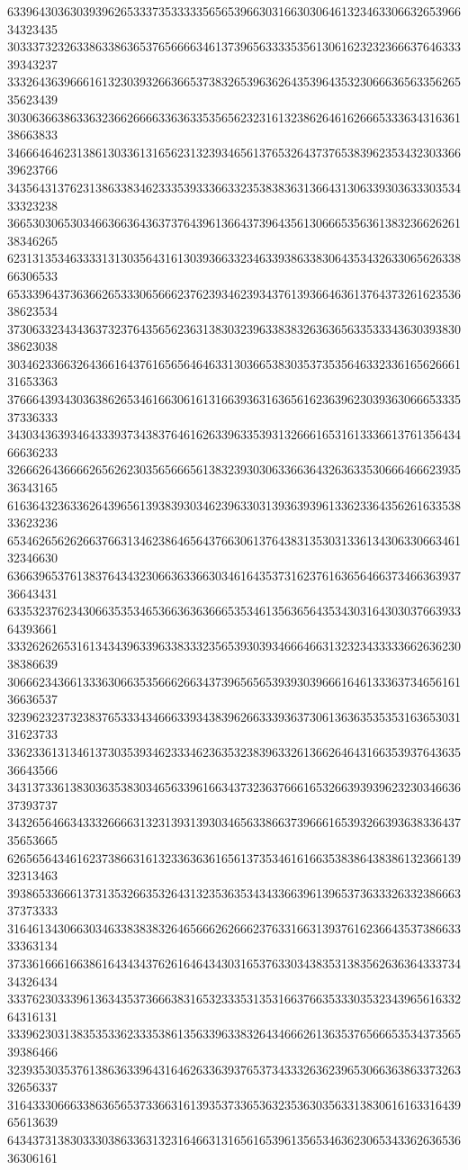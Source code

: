 63396430363039396265333735333335656539663031663030646132346330663265396634323435
30333732326338633863653765666634613739656333353561306162323236663764633339343237
33326436396661613230393266366537383265396362643539643532306663656335626535623439
30306366386336323662666633636335356562323161323862646162666533363431636138663833
34666464623138613033613165623132393465613765326437376538396235343230336639623766
34356431376231386338346233353933366332353838363136643130633930363330353433323238
36653030653034663663643637376439613664373964356130666535636138323662626138346265
62313135346333313130356431613039366332346339386338306435343263306562633866306533
65333964373636626533306566623762393462393437613936646361376437326162353638623534
37306332343436373237643565623631383032396338383263636563353334363039383038623038
30346233663264366164376165656464633130366538303537353564633233616562666131653363
37666439343036386265346166306161316639363163656162363962303936306665333537336333
34303436393464333937343837646162633963353931326661653161333661376135643466636233
32666264366662656262303565666561383239303063366364326363353066646662393536343165
61636432363362643965613938393034623963303139363939613362336435626163353833623236
65346265626266376631346238646564376630613764383135303133613430633066346132346630
63663965376138376434323066363366303461643537316237616365646637346636393736643431
63353237623430663535346536636363666535346135636564353430316430303766393364393661
33326262653161343439633963383332356539303934666466313232343333366263623038386639
30666234366133363066353566626634373965656539393039666164613336373465616136636537
32396232373238376533343466633934383962663339363730613636353535316365303131623733
33623361313461373035393462333462363532383963326136626464316635393764363536643566
34313733613830363538303465633961663437323637666165326639393962323034663637393737
34326564663433326666313231393139303465633866373966616539326639363833643735653665
62656564346162373866316132336363616561373534616166353838643838613236613932313463
39386533666137313532663532643132353635343433663961396537363332633238666337373333
31646134306630346338383832646566626266623763316631393761623664353738663333363134
37336166616638616434343762616464343031653763303438353138356263636433373434326434
33376230333961363435373666383165323335313531663766353330353234396561633264316131
33396230313835353362333538613563396338326434666261363537656665353437356539386466
32393530353761386363396431646263363937653734333263623965306636386337326332656337
31643330666338636565373366316139353733653632353630356331383061616331643965613639
64343731383033303863363132316466313165616539613565346362306534336263653636306161
